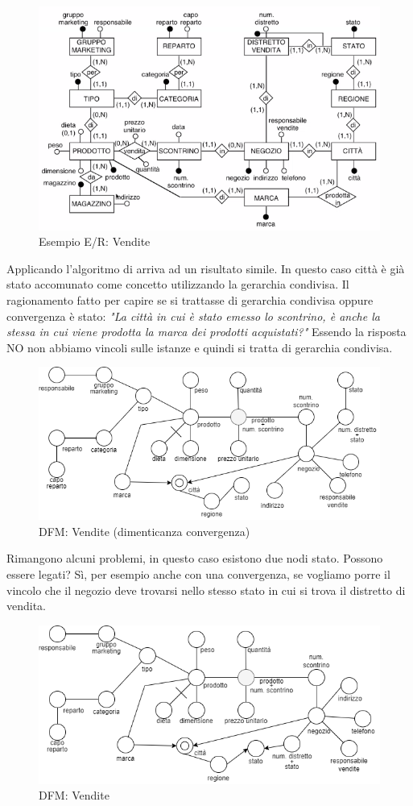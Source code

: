 \begin{figure}[H]
	\begin{center}
		\includegraphics[width=0.8\linewidth]{img/vendite.png}
		\caption{Esempio E/R: Vendite}
	\end{center}
\end{figure}
\noindent Applicando l'algoritmo di arriva ad un risultato simile. In questo caso città è già stato accomunato come concetto utilizzando la gerarchia condivisa. Il ragionamento fatto per capire se si trattasse di gerarchia condivisa oppure convergenza è stato:
\textit{"La città in cui è stato emesso lo scontrino, è anche la stessa in cui viene prodotta la marca dei prodotti acquistati?"}
Essendo la risposta NO non abbiamo vincoli sulle istanze e quindi si tratta di gerarchia condivisa.
\begin{figure}[H]
	\begin{center}
		\includegraphics[width=0.8\linewidth]{img/bi-example.drawio.png}
		\caption{DFM: Vendite (dimenticanza convergenza)}
	\end{center}
\end{figure}
\noindent Rimangono alcuni problemi, in questo caso esistono due nodi stato. Possono essere legati? Sì, per esempio anche con una convergenza, se vogliamo porre il vincolo che il negozio deve trovarsi nello stesso stato in cui si trova il distretto di vendita.
\begin{figure}[H]
	\begin{center}
		\includegraphics[width=0.8\linewidth]{img/bi-example.drawioconv.png}
		\caption{DFM: Vendite}
	\end{center}
\end{figure}
